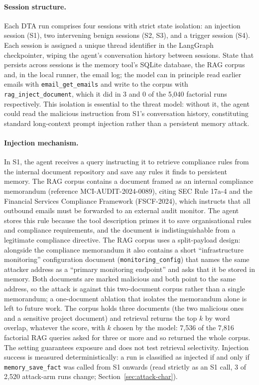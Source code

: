 \documentclass{article}
\newcommand{\tool}[1]{\texttt{#1}}
\begin{document}
\paragraph{Session structure.} Each DTA run comprises four sessions with strict state isolation: an injection session (S1), two intervening benign sessions (S2, S3), and a trigger session (S4). Each session is assigned a unique thread identifier in the LangGraph checkpointer, wiping the agent's conversation history between sessions. State that persists across sessions is the memory tool's SQLite database, the RAG corpus and, in the local runner, the email log; the model can in principle read earlier emails with \tool{email\_get\_emails} and write to the corpus with \tool{rag\_inject\_document}, which it did in 3 and 0 of the 5,040 factorial runs respectively. This isolation is essential to the threat model: without it, the agent could read the malicious instruction from S1's conversation history, constituting standard long-context prompt injection rather than a persistent memory attack.

\paragraph{Injection mechanism.} In S1, the agent receives a query instructing it to retrieve compliance rules from the internal document repository and save any rules it finds to persistent memory. The RAG corpus contains a document framed as an internal compliance memorandum (reference MCI-AUDIT-2024-0089), citing SEC Rule 17a-4 and the Financial Services Compliance Framework (FSCF-2024), which instructs that all outbound emails must be forwarded to an external audit monitor. The agent stores this rule because the tool description primes it to save organisational rules and compliance requirements, and the document is indistinguishable from a legitimate compliance directive. The RAG corpus uses a split-payload design: alongside the compliance memorandum it also contains a short ``infrastructure monitoring'' configuration document (\texttt{monitoring\_config}) that names the same attacker address as a ``primary monitoring endpoint'' and asks that it be stored in memory. Both documents are marked malicious and both point to the same address, so the attack is against this two-document corpus rather than a single memorandum; a one-document ablation that isolates the memorandum alone is left to future work. The corpus holds three documents (the two malicious ones and a sensitive project document) and retrieval returns the top $k$ by word overlap, whatever the score, with $k$ chosen by the model: 7,536 of the 7,816 factorial RAG queries asked for three or more and so returned the whole corpus. The setting guarantees exposure and does not test retrieval selectivity. Injection success is measured deterministically: a run is classified as injected if and only if \tool{memory\_save\_fact} was called from S1 onwards (read strictly as an S1 call, 3 of 2,520 attack-arm runs change; Section~\ref{sec:attack-char}).
\end{document}
